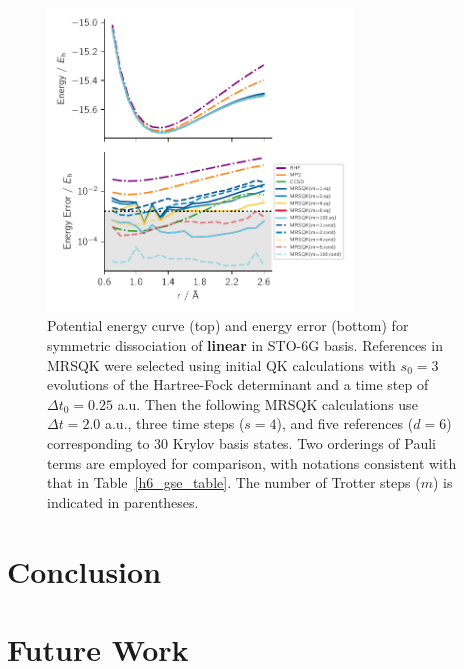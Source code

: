 \documentclass[journal=jctcce,manuscript=article]{achemso}
\newcommand{\methodabbr}[0]{MRSQK\xspace}
\begin{document}
\begin{figure}[h!]
  \centering
  \includegraphics[width=3.2in]{figs/BeH2_pes_error.pdf}
  \caption{Potential energy curve (top) and energy error (bottom) for symmetric dissociation of \textbf{linear } in STO-6G basis.
  References in \methodabbr were selected using initial QK calculations with $s_0 = 3$ evolutions of the Hartree-Fock determinant and a time step of $ \Delta t_0 = 0.25$ a.u.
  Then the following \methodabbr calculations use $ \Delta t = 2.0$ a.u., three time steps ($s=4$), and five references ($d=6$) corresponding to 30 Krylov basis states. 
  Two orderings of Pauli terms are employed for comparison, with notations consistent with that in Table~\ref{h6_gse_table}.
  The number of Trotter steps ($m$) is indicated in parentheses.
   }
\label{beh2_pes}
\end{figure}


\section{Conclusion}


\section{Future Work}




\newpage

{}
\end{document}
